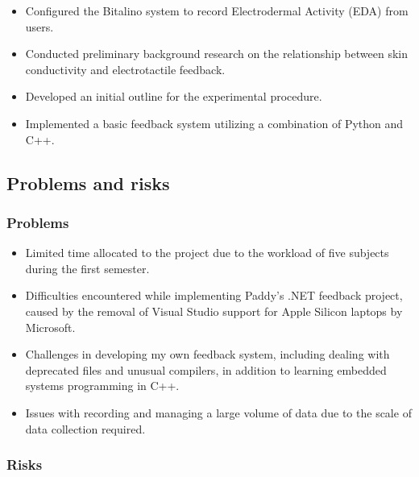 \documentclass[11pt]{article}
\begin{document}
\begin{itemize}
    \item Configured the Bitalino system to record Electrodermal Activity (EDA) from users.
    \item Conducted preliminary background research on the relationship between skin conductivity and electrotactile feedback.
    \item Developed an initial outline for the experimental procedure.
    \item Implemented a basic feedback system utilizing a combination of Python and C++.
\end{itemize}



\subsection{Problems and risks}\label{problems-and-risks}

\subsubsection{Problems}\label{problems}

\begin{itemize}
    \item Limited time allocated to the project due to the workload of five subjects during the first semester.
    \item Difficulties encountered while implementing Paddy’s .NET feedback project, caused by the removal of Visual Studio support for Apple Silicon laptops by Microsoft.
    \item Challenges in developing my own feedback system, including dealing with deprecated files and unusual compilers, in addition to learning embedded systems programming in C++.
    \item Issues with recording and managing a large volume of data due to the scale of data collection required.
\end{itemize}


\subsubsection{Risks}\label{risks}
\end{document}
